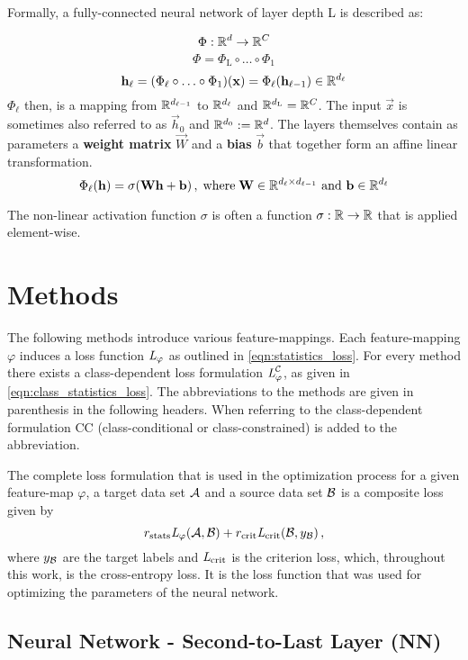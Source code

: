 Formally, a fully-connected neural network of layer depth L is described as:

\[
    \Phi : \mathbb{R}^d \to \mathbb{R}^C
\]
\[
    \Phi = \Phi_\text{L} \circ \ldots \circ \Phi_1
\]
\[
    \mathbf h_\ell = (\Phi_\ell \circ \ldots \circ \Phi_1) (\mathbf x) =
    \Phi_\ell(\mathbf h_{\ell-1}) \in \mathbb{R}^{d_\ell}
\]
$\Phi_\ell$ then, is a mapping from $\mathbb{R}^{d_{\ell-1}}$ to $\mathbb{R}^{d_\ell}$ and $\mathbb{R}^{d_\textnormal{L}} = \mathbb{R}^C$.
The input $\vec x$ is sometimes also referred to as $\vec h_0$ and $\mathbb{R}^{d_0} := \mathbb{R}^d$.
The layers themselves contain as parameters a \textbf{weight matrix} $\vec W$ and a \textbf{bias} $\vec b$
that together form an affine linear transformation.
\[
    \Phi_\ell(\mathbf h) = \sigma (\mathbf W \mathbf h + \mathbf b) \,, \; \text{where} \;
    \mathbf W \in \mathbb{R}^{d_\ell \times d_{\ell-1}} \text{ and } 
    \mathbf b \in \mathbb{R}^{d_\ell}
\]

The non-linear activation function $\sigma$ is often a function $\sigma:\mathbb{R}\to\mathbb{R}$ that is applied element-wise.



\section{Methods}
\label{sec:methods}

The following methods introduce various feature-mappings.
Each feature-mapping $\varphi$ induces a loss function $\textit{L}_\varphi$ as outlined in \cref{eqn:statistics_loss}.
For every method there exists a class-dependent loss formulation $\textit{L}_\varphi^{\mathcal C}$,
as given in \cref{eqn:class_statistics_loss}.
The abbreviations to the methods are given in parenthesis in the following headers. 
When referring to the class-dependent formulation CC (class-conditional or
class-constrained) is added to the abbreviation.

The complete loss formulation that is used in the optimization process 
for a given feature-map $\varphi$, a target data set $\mathcal A$ and a source data set $\mathcal B$ 
is a composite loss given by
\[
    r_\text{stats}\textit{L}_\varphi(\mathcal A, \mathcal B) + r_\text{crit}\textit{L}_\text{crit}(\mathcal B, y_{\mathcal B}) \,,
\]
where $y_{\mathcal B}$ are the target labels and $\textit{L}_\text{crit}$ is the criterion loss, which, throughout this work, is the cross-entropy loss.
It is the loss function that was used for optimizing the parameters of the neural network.



\subsection{Neural Network - Second-to-Last Layer (NN)}

